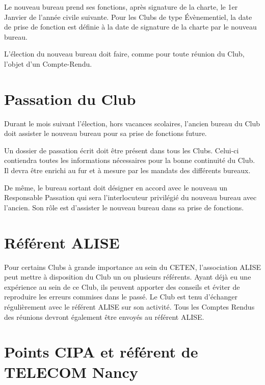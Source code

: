 \documentclass{article} %
\begin{document}
\begin{multicols}{2}
{			Le nouveau bureau prend ses fonctions, après signature de
			la charte, le 1er Janvier de l’année civile suivante. Pour les
			Clubs de type Évènementiel, la date de prise de fonction est
			définie à la date de signature de la charte par le nouveau
			bureau.

			L’élection du nouveau bureau doit faire, comme pour toute
			réunion du Club, l’objet d’un Compte-Rendu.

		}
		
		\section{Passation du Club}

		{\small

			Durant le mois suivant l’élection, hors vacances scolaires,
			l’ancien bureau du Club doit assister le nouveau bureau pour
			sa prise de fonctions future.

			Un dossier de passation écrit doit être présent dans tous les
			Clubs. Celui-ci contiendra toutes les informations
			nécessaires pour la bonne continuité du Club. Il devra être
			enrichi au fur et à mesure par les mandats des différents
			bureaux.

			De même, le bureau sortant doit désigner en accord avec le
			nouveau un Responsable Passation qui sera l’interlocuteur
			privilégié du nouveau bureau avec l’ancien. Son rôle est
			d’assister le nouveau bureau dans sa prise de fonctions.

		}
		
		\section{Référent ALISE}

		{\small

			Pour certains Clubs à grande importance au sein du CETEN,
			l’association ALISE peut mettre à disposition du Club un ou
			plusieurs référents. Ayant déjà eu une expérience au sein de
			ce Club, ils peuvent apporter des conseils et éviter de
			reproduire les erreurs commises dans le passé. Le Club est
			tenu d’échanger régulièrement avec le référent ALISE sur
			son activité. Tous les Comptes Rendus des réunions devront
			également être envoyés au référent ALISE.

		}
		
		\section{Points CIPA et référent de TELECOM Nancy}


\end{multicols}
\end{document}
